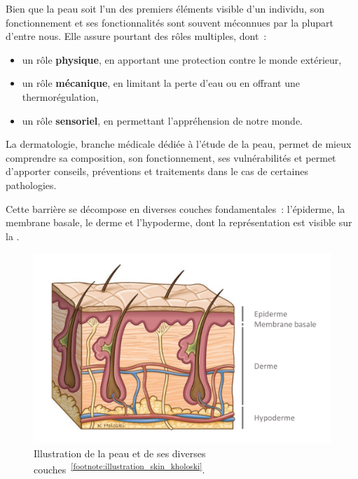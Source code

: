 Bien que la peau soit l'un des premiers éléments visible d'un individu, son fonctionnement et ses fonctionnalités sont souvent méconnues par la plupart d’entre nous. Elle assure pourtant des rôles multiples, dont~:
\begin{itemize}
    \item un rôle \textbf{physique}, en apportant une protection contre le monde extérieur,
    \item un rôle \textbf{mécanique}, en limitant la perte d’eau ou en offrant une thermorégulation,
    \item un rôle \textbf{sensoriel}, en permettant l'appréhension de notre monde.
\end{itemize}\par

La dermatologie, branche médicale dédiée à l’étude de la peau, permet de mieux comprendre sa composition, son fonctionnement, ses vulnérabilités et permet d’apporter conseils, préventions et traitements dans le cas de certaines pathologies.\par

Cette barrière se décompose en diverses couches fondamentales~: l’épiderme, la membrane basale, le derme et l’hypoderme, dont la représentation est visible sur la .\par
\begin{figure}[H]
    \centering
    \includegraphics[width=0.6\linewidth]{contents/chapter_1/resources/illustration_skin_kholoski.pdf}
    \caption{Illustration de la peau et de ses diverses couches~\textsuperscript{\ref{footnote:illustration_skin_kholoski}}.}
    \label{fig:illustration_skin_kholoski}
\end{figure}\par 

\addtocounter{footnote}{1}


